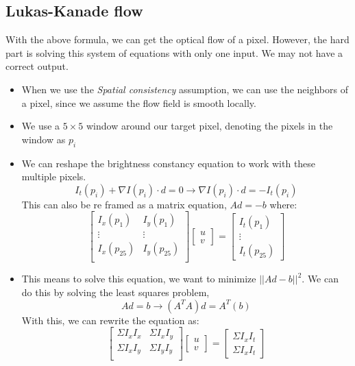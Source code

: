 \documentclass{article}
\begin{document}
\subsection{Lukas-Kanade flow}
With the above formula, we can get the optical flow of a pixel. However, the hard part is solving this system of equations with only one input. We may not have a correct output.
\begin{itemize}
    \item When we use the \textit{Spatial consistency} assumption, we can use the neighbors of a pixel, since we assume the flow field is smooth locally. 
    \item We use a $5 \times 5$ window around our target pixel, denoting the pixels in the window as $p_i$ 
    \item We can reshape the brightness constancy equation to work with these multiple pixels. 
    $$I_t(p_i) + \nabla I(p_i)\cdot d = 0 \rightarrow \nabla I(p_i)\cdot d = -I_t(p_i)$$
    This can also be re framed as a matrix equation, $Ad = -b$ where:
    $$\begin{bmatrix}
    I_x(p_1) & I_y(p_1) \\ 
    \vdots & \vdots \\ 
    I_x(p_{25}) & I_y(p_{25}) \\ 
    \end{bmatrix}\begin{bmatrix}
    u\\v
    \end{bmatrix} = \begin{bmatrix}
    I_t(p_1)\\ \vdots \\ I_t(p_{25})
    \end{bmatrix}$$
    \item This means to solve this equation, we want to minimize $||Ad - b||^2$. We can do this by solving the least squares problem, 
    $$Ad = b \rightarrow (A^TA)d = A^T(b)$$
    With this, we can rewrite the equation as:
    $$\begin{bmatrix}
    \Sigma I_xI_x & \Sigma I_xI_y \\ 
    \Sigma I_xI_y & \Sigma I_yI_y \\ 
    \end{bmatrix}\begin{bmatrix}
    u\\v
    \end{bmatrix} = \begin{bmatrix}
    \Sigma I_xI_t \\ \Sigma I_xI_t

\end{bmatrix}$$
\end{itemize}
\end{document}

